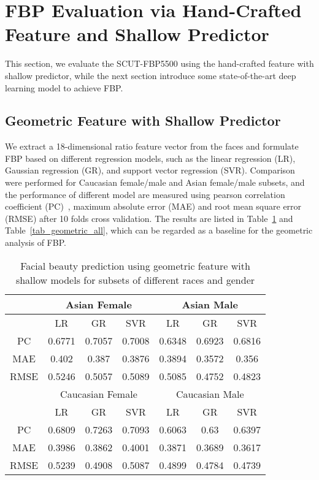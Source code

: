\documentclass[10pt,conference,a4paper]{IEEEtran}
\begin{document}
\section{FBP Evaluation via Hand-Crafted Feature and Shallow Predictor}
This section, we evaluate the SCUT-FBP5500 using the hand-crafted feature with shallow predictor, while the next section introduce some state-of-the-art deep learning model to achieve FBP.

\subsection{Geometric Feature with Shallow Predictor}
We extract a 18-dimensional ratio feature vector from the faces and formulate FBP based on different regression models, such as the linear regression (LR), Gaussian regression (GR), and support vector regression (SVR). Comparison were performed for Caucasian female/male and Asian female/male subsets, and the performance of different model are measured using pearson correlation coefficient (PC)~\cite{2006nc_Dror}, maximum absolute error (MAE) and root mean square error (RMSE) after 10 folds cross validation. The results are listed in Table~\ref{tab_geometric} and Table~\ref{tab_geometric_all}, which can be regarded as a baseline for the geometric analysis of FBP.





\begin{table}[!ht]
\centering
\caption{Facial beauty prediction using geometric feature with shallow models for subsets of different races and gender}
\label{tab_geometric}
\begin{tabular}{c|ccc|ccc}
\hline
\multirow{2}{*}{} & \multicolumn{3}{c|}{Asian Female} & \multicolumn{3}{c}{Asian Male}\\
\hline
 & LR & GR & SVR & LR & GR & SVR  \\
\hline
PC & 0.6771 & 0.7057 & 0.7008 & 0.6348 & 0.6923 & 0.6816  \\
MAE & 0.402 & 0.387 & 0.3876 & 0.3894 & 0.3572 & 0.356  \\
RMSE & 0.5246 & 0.5057 & 0.5089 & 0.5085 & 0.4752 & 0.4823 \\
\hline
\hline
\multirow{2}{*}{}  & \multicolumn{3}{c|}{Caucasian Female} & \multicolumn{3}{c}{Caucasian Male}\\
\hline
 & LR & GR & SVR & LR & GR & SVR \\
\hline
PC &  0.6809 & 0.7263 & 0.7093 & 0.6063 & 0.63 & 0.6397 \\
MAE &  0.3986 & 0.3862 & 0.4001 & 0.3871 & 0.3689 & 0.3617 \\
RMSE  & 0.5239 & 0.4908 & 0.5087 & 0.4899 & 0.4784 & 0.4739 \\
\hline
\end{tabular}
\end{table}
\end{document}
